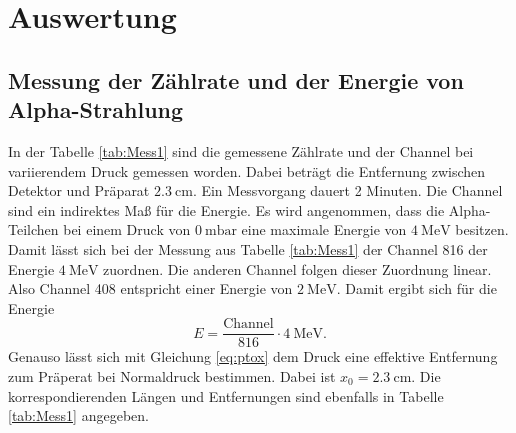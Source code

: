 \section{Auswertung}
\label{sec:Auswertung}

\subsection{Messung der Zählrate und der Energie von Alpha-Strahlung}
In der Tabelle \ref{tab:Mess1} sind die gemessene Zählrate und der Channel bei variierendem Druck gemessen worden.
Dabei beträgt die Entfernung zwischen Detektor und Präparat $\qty{2.3}{\centi\meter}$. Ein Messvorgang dauert 2 Minuten.
Die Channel sind ein indirektes Maß für die Energie. Es wird angenommen, dass die Alpha-Teilchen bei
einem Druck von $\qty{0}{\milli\bar}$ eine maximale Energie von $\qty{4}{\mega\electronvolt}$ besitzen.
Damit lässt sich bei der Messung aus Tabelle \ref{tab:Mess1} der Channel 816 der Energie $\qty{4}{\mega\electronvolt}$
zuordnen. Die anderen Channel folgen dieser Zuordnung linear. Also Channel 408 entspricht
einer Energie von $\qty{2}{\mega\electronvolt}$.
Damit ergibt sich für die Energie
\begin{equation}
  E=\frac{\text{Channel}}{816}\cdot \qty{4}{\mega\electronvolt}.
  \label{eq:En1}
\end{equation}
Genauso lässt sich mit Gleichung \eqref{eq:ptox} dem Druck eine effektive Entfernung zum Präperat
bei Normaldruck bestimmen. Dabei ist $x_0=\qty{2.3}{\centi\meter}$.
Die korrespondierenden Längen und Entfernungen sind ebenfalls in Tabelle \ref{tab:Mess1} angegeben.
